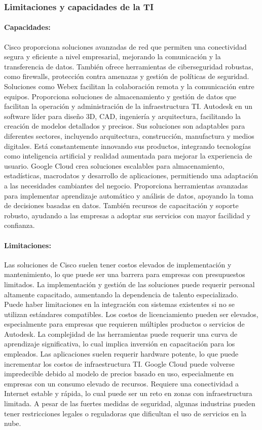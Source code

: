     \subsubsection{Limitaciones y capacidades de la TI}
    \paragraph*{Capacidades:}
        Cisco proporciona soluciones avanzadas de red que permiten una conectividad segura y eficiente a nivel empresarial, mejorando la comunicación y la transferencia de datos. También ofrece herramientas de ciberseguridad robustas, como firewalls, protección contra amenazas y gestión de políticas de seguridad. Soluciones como Webex facilitan la colaboración remota y la comunicación entre equipos. Proporciona soluciones de almacenamiento y gestión de datos que facilitan la operación y administración de la infraestructura TI.
        Autodesk en un software líder para diseño 3D, CAD, ingeniería y arquitectura, facilitando la creación de modelos detallados y precisos. Sus soluciones son adaptables para diferentes sectores, incluyendo arquitectura, construcción, manufactura y medios digitales. Está constantemente innovando sus productos, integrando tecnologías como inteligencia artificial y realidad aumentada para mejorar la experiencia de usuario.
        Google Cloud crea soluciones escalables para almacenamiento, estadísticas, macrodatos y desarrollo de aplicaciones, permitiendo una adaptación a las necesidades cambiantes del negocio. Proporciona herramientas avanzadas para implementar aprendizaje automático y análisis de datos, apoyando la toma de decisiones basadas en datos. También recursos de capacitación y soporte robusto, ayudando a las empresas a adoptar sus servicios con mayor facilidad y confianza.
    \paragraph*{Limitaciones:}
        Las soluciones de Cisco suelen tener costos elevados de implementación y mantenimiento, lo que puede ser una barrera para empresas con presupuestos limitados. La implementación y gestión de las soluciones puede requerir personal altamente capacitado, aumentando la dependencia de talento especializado. Puede haber limitaciones en la integración con sistemas existentes si no se utilizan estándares compatibles.
        Los costos de licenciamiento pueden ser elevados, especialmente para empresas que requieren múltiples productos o servicios de Autodesk. La complejidad de las herramientas puede requerir una curva de aprendizaje significativa, lo cual implica inversión en capacitación para los empleados. Las aplicaciones suelen requerir hardware potente, lo que puede incrementar los costos de infraestructura TI.
        Google Cloud puede volverse impredecible debido al modelo de precios basado en uso, especialmente en empresas con un consumo elevado de recursos. Requiere una conectividad a Internet estable y rápida, lo cual puede ser un reto en zonas con infraestructura limitada. A pesar de las fuertes medidas de seguridad, algunas industrias pueden tener restricciones legales o reguladoras que dificultan el uso de servicios en la nube.
